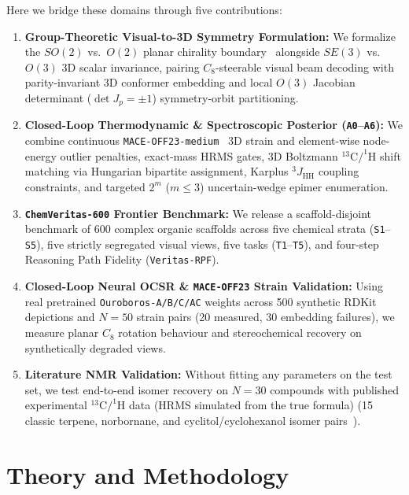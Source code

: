 \documentclass[10pt,twocolumn]{article}
\begin{document}
Here we bridge these domains through five contributions:
\begin{enumerate}
  \item \textbf{Group-Theoretic Visual-to-3D Symmetry Formulation:} We formalize the $SO(2)$ vs.\ $O(2)$ planar chirality boundary~\cite{Weiler2019Steerable} alongside $SE(3)$ vs.\ $O(3)$ 3D scalar invariance, pairing $C_8$-steerable visual beam decoding with parity-invariant 3D conformer embedding and local $O(3)$ Jacobian determinant ($\det J_p = \pm 1$) symmetry-orbit partitioning.
  \item \textbf{Closed-Loop Thermodynamic \& Spectroscopic Posterior (\texttt{A0}--\texttt{A6}):} We combine continuous \texttt{MACE-OFF23-medium}~\cite{Kovacs2025MACEOFF} 3D strain and element-wise node-energy outlier penalties, exact-mass HRMS gates, 3D Boltzmann $^{13}\text{C}/^{1}\text{H}$ shift matching via Hungarian bipartite assignment, Karplus $^3J_{\text{HH}}$ coupling constraints, and targeted $2^m$ ($m \le 3$) uncertain-wedge epimer enumeration.
  \item \textbf{\texttt{ChemVeritas-600} Frontier Benchmark:} We release a scaffold-disjoint benchmark of 600 complex organic scaffolds across five chemical strata (\texttt{S1}--\texttt{S5}), five strictly segregated visual views, five tasks (\texttt{T1}--\texttt{T5}), and four-step Reasoning Path Fidelity (\texttt{Veritas-RPF}).
  \item \textbf{Closed-Loop Neural OCSR \& \texttt{MACE-OFF23} Strain Validation:} Using real pretrained \texttt{Ouroboros-A/B/C/AC} weights across 500 synthetic RDKit depictions and $N=50$ strain pairs (20 measured, 30 embedding failures), we measure planar $C_8$ rotation behaviour and stereochemical recovery on synthetically degraded views.
  \item \textbf{Literature NMR Validation:} Without fitting any parameters on the test set, we test end-to-end isomer recovery on $N=30$ compounds with published experimental $^{13}\text{C}/^{1}\text{H}$ data (HRMS simulated from the true formula) (15 classic terpene, norbornane, and cyclitol/cyclohexanol isomer pairs~\cite{Bohlmann1975Terpene13C,Lippmaa1970Bicyclic13C,Grutzner1970Norbornyl13C,Dalling1967Cyclohexanes13C,Grover1974Cyclohexanols13C}).
\end{enumerate}

\section{Theory and Methodology}
\label{sec:methods}
\end{document}

